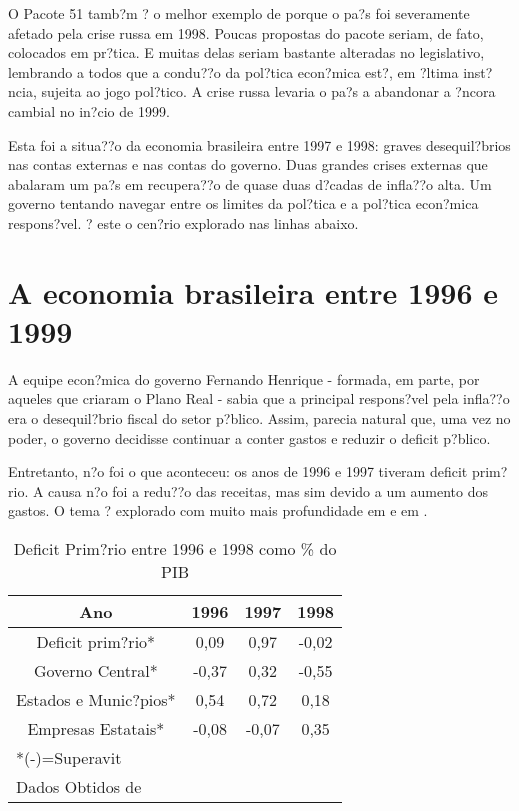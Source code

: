 \documentclass{article}
\begin{document}
O Pacote 51 tamb?m ? o melhor exemplo de porque o pa?s foi severamente afetado pela crise russa em 1998. Poucas propostas do pacote seriam, de fato, colocados em pr?tica. E muitas delas seriam bastante alteradas no legislativo, lembrando a todos que a condu??o da pol?tica econ?mica est?, em ?ltima inst?ncia, sujeita ao jogo pol?tico. A crise russa levaria o pa?s a abandonar a ?ncora cambial no in?cio de 1999.  

Esta foi a situa??o da economia brasileira entre 1997 e 1998: graves desequil?brios nas contas externas e nas contas do governo. Duas grandes crises externas que abalaram um pa?s em recupera??o de quase duas d?cadas de infla??o alta. Um governo tentando navegar entre os limites da pol?tica e a pol?tica econ?mica respons?vel. ? este o cen?rio explorado nas linhas abaixo.

\section{A economia brasileira entre 1996 e 1999}

A equipe econ?mica do governo Fernando Henrique - formada, em parte, por aqueles que criaram o Plano Real - sabia que a principal respons?vel pela infla??o era o desequil?brio fiscal do setor p?blico. Assim, parecia natural que, uma vez no poder, o governo decidisse continuar a conter gastos e reduzir o deficit p?blico.

Entretanto, n?o foi o que aconteceu: os anos de 1996 e 1997 tiveram deficit prim?rio. A causa n?o foi a redu??o das receitas, mas sim devido a um aumento dos gastos. O tema ? explorado com muito mais profundidade em \citet{Grossmann1998} e em \citet{Giambiagi2002}.
\smallskip

\begin{table}[h]
\begin{center}
\begin{tabular}[c]{|c|c|c|c|}
\hline
Ano & 1996 & 1997 & 1998\\ \hline
Deficit prim?rio* & 0,09 & 0,97 & -0,02 \\ \hline
Governo Central* & -0,37 & 0,32 & -0,55\\ \hline
Estados e Munic?pios* & 0,54 & 0,72 & 0,18 \\ \hline
Empresas Estatais* & -0,08 & -0,07 & 0,35 \\ \hline
\multicolumn{4}{l}{*(-)=Superavit} \\
\multicolumn{4}{l}{Dados Obtidos de \citet{Giambiagi2002}} \\
\end{tabular}
\caption{Deficit Prim?rio entre 1996 e 1998 como \% do PIB}
\end{center}
\end{table}
\end{document}
